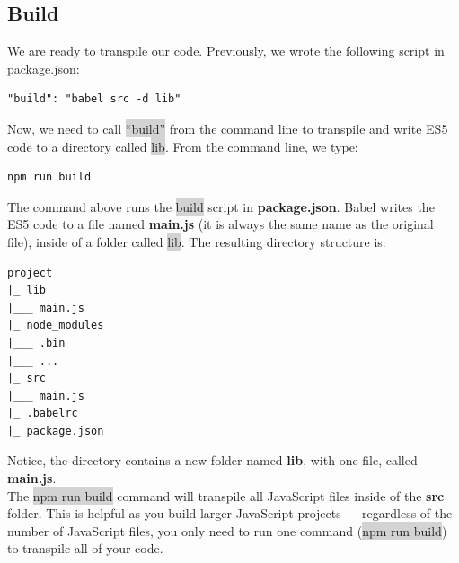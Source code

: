 \documentclass[11pt]{article}
\begin{document}
\subsection{Build}
We are ready to transpile our code. Previously, we wrote the following script in package.json:
\begin{lstlisting}
"build": "babel src -d lib"
\end{lstlisting}
Now, we need to call \colorbox{lightgray}{``build''} from the command line to transpile and write ES5 code to a directory called \colorbox{lightgray}{lib}. From the command line, we type:
\begin{lstlisting}[basicstyle=\small\ttfamily\color{theWhite}, backgroundcolor = \color{theBlack}, language = Comment]
npm run build
\end{lstlisting}
The command above runs the \colorbox{lightgray}{build} script in \textbf{package.json}. Babel writes the ES5 code to a file named \textbf{main.js} (it is always the same name as the original file), inside of a folder called \colorbox{lightgray}{lib}. The resulting directory structure is:
\begin{lstlisting}[basicstyle=\small\ttfamily\color{theWhite}, backgroundcolor = \color{theBlack}, language = Comment]
project
|_ lib
|___ main.js
|_ node_modules
|___ .bin
|___ ...
|_ src
|___ main.js
|_ .babelrc
|_ package.json
\end{lstlisting}
Notice, the directory contains a new folder named \textbf{lib}, with one file, called \textbf{main.js}. \\
\newline
The \colorbox{lightgray}{npm run build} command will transpile all JavaScript files inside of the \textbf{src} folder. This is helpful as you build larger JavaScript projects — regardless of the number of JavaScript files, you only need to run one command (\colorbox{lightgray}{npm run build}) to transpile all of your code.
\end{document}
